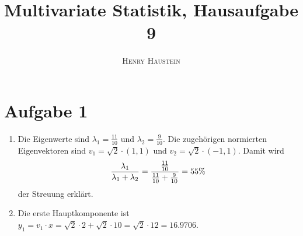 \documentclass{article}
\title{\textbf{Multivariate Statistik, Hausaufgabe 9}}
\author{\textsc{Henry Haustein}}
\date{}
\begin{document}
	\maketitle
	
	\section*{Aufgabe 1}
	\begin{enumerate}[label=(\alph*)]
		\item Die Eigenwerte sind $\lambda_1=\frac{11}{10}$ und $\lambda_2=\frac{9}{10}$. Die zugehörigen normierten Eigenvektoren sind $v_1=\sqrt{2}\cdot (1,1)$ und $v_2=\sqrt{2}\cdot (-1,1)$. Damit wird
		\begin{align}
			\frac{\lambda_1}{\lambda_1 + \lambda_2} = \frac{\frac{11}{10}}{\frac{11}{10} + \frac{9}{10}} = 55\% \notag
		\end{align}
		der Streuung erklärt.
		\item Die erste Hauptkomponente ist $y_1=v_1\cdot x = \sqrt{2}\cdot 2 + \sqrt{2}\cdot 10 = \sqrt{2}\cdot 12 = 16.9706$.
	\end{enumerate}
	
\end{document}
